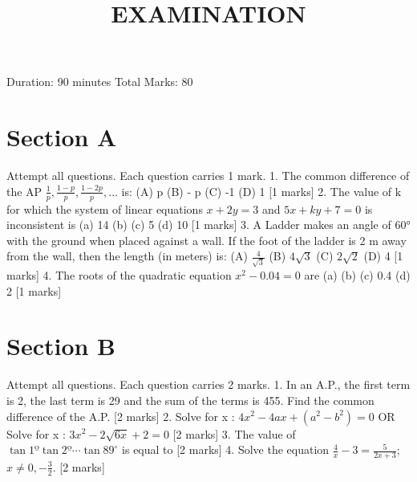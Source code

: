 \documentclass{article}%
\title{EXAMINATION}%
\author{}%
\date{}%
\begin{document}
%
\pagestyle{empty}%
\normalsize%
\maketitle%
Duration: 90 minutes \hfill Total Marks: 80%
\vspace{0.5cm}%
\section*{Section A}%
\label{sec:SectionA}%
Attempt all questions. Each question carries 1 mark.%
\vspace{0.3cm}%
1. The common difference of the AP $ \frac { 1 } { p } , \frac { 1 - p } { p } , \frac { 1 - 2 p } { p } , \ldots $ is: (A) p (B) - p (C) -1 (D) 1 [1 marks]%
\vspace{0.4cm}%
2. The value of $ \mathrm{k} $ for which the system of linear equations $ x + 2y = 3 $ and $ 5x + k y + 7 = 0 $ is inconsistent is (a) 14 (b)  (c) 5 (d) 10 [1 marks]%
\vspace{0.4cm}%
3. A Ladder makes an angle of 60° with the ground when placed against a wall. If the foot of the ladder is 2 m away from the wall, then the length (in meters) is: (A) $ \frac{4}{\sqrt{3}} $ (B) $ 4\sqrt{3} $ (C) $ 2\sqrt{2} $ (D) 4 [1 marks]%
\vspace{0.4cm}%
4. The roots of the quadratic equation $ x^{2} - 0.04 = 0 $ are (a)  (b)  (c) 0.4 (d) 2 [1 marks]%
\vspace{0.4cm}

%
\section*{Section B}%
\label{sec:SectionB}%
Attempt all questions. Each question carries 2 marks.%
\vspace{0.3cm}%
1. In an A.P., the first term is 2, the last term is 29 and the sum of the terms is 455. Find the common difference of the A.P. [2 marks]%
\vspace{0.4cm}%
2. Solve for x : $ 4x^{2} - 4ax + \left( a^{2} - b^{2} \right) = 0 $ OR Solve for x : $ 3x^{2} - 2\sqrt{6x} + 2 = 0 $ [2 marks]%
\vspace{0.4cm}%
3. The value of $ \tan 1º \tan 2º \cdots \tan 89^{\circ} $ is equal to [2 marks]%
\vspace{0.4cm}%
4. Solve the equation $ \frac{4}{x} - 3 = \frac{5}{2x + 3} $; $ x \neq 0, -\frac{3}{2} $. [2 marks]%
\vspace{0.4cm}
\end{document}
